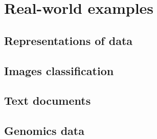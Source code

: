 \chapter{Real-world examples}
\label{chapter:real-data}

\lipsum[1]


\section{Representations of data}
\label{section:real-representations}

\lipsum[1]


\section{Images classification}
\label{section:real-images}

\lipsum[1]


\section{Text documents}
\label{section:real-text}

\lipsum[1]


\section{Genomics data}
\label{section:real-genomics}

\lipsum[1]

